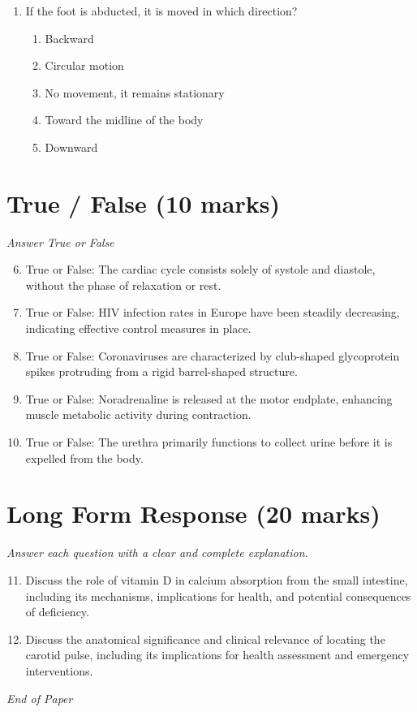 \documentclass[12pt]{article}
\begin{document}
\begin{enumerate}[label=\arabic*.]
\begin{enumerate}[label=(\alph*)]
    \item Fat conducts electricity better than muscle
    \item Fat contains more electrolytes than muscle
    \item Muscle weighs more than fat
    \item Muscle is denser than fat
    \item Fat is denser than muscle
\end{enumerate}
\item If the foot is abducted, it is moved in which direction?
\begin{enumerate}[label=(\alph*)]
    \item Backward
    \item Circular motion
    \item No movement, it remains stationary
    \item Toward the midline of the body
    \item Downward
\end{enumerate}
\end{enumerate}

\section*{True / False (10 marks)}
\textit{Answer True or False}
\begin{enumerate}[label=\arabic*.]
\setcounter{enumi}{5}
\item True or False: The cardiac cycle consists solely of systole and diastole, without the phase of relaxation or rest.
\item True or False: HIV infection rates in Europe have been steadily decreasing, indicating effective control measures in place.
\item True or False: Coronaviruses are characterized by club-shaped glycoprotein spikes protruding from a rigid barrel-shaped structure.
\item True or False: Noradrenaline is released at the motor endplate, enhancing muscle metabolic activity during contraction.
\item True or False: The urethra primarily functions to collect urine before it is expelled from the body.
\end{enumerate}

\section*{Long Form Response (20 marks)}
\textit{Answer each question with a clear and complete explanation.}
\begin{enumerate}[label=\arabic*.]
\setcounter{enumi}{10}
\item Discuss the role of vitamin D in calcium absorption from the small intestine, including its mechanisms, implications for health, and potential consequences of deficiency.
\item Discuss the anatomical significance and clinical relevance of locating the carotid pulse, including its implications for health assessment and emergency interventions.
\end{enumerate}

\vfill
\noindent\textit{End of Paper}
\end{document}
